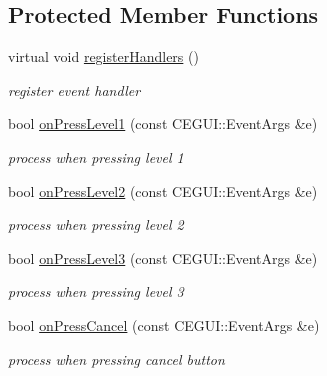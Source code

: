 \subsection*{Protected Member Functions}
\begin{DoxyCompactItemize}
\item 
virtual void \hyperlink{class_n_c_t_u_1_1_level_menu_window_a44e082fb42481f4e35e137feaf496279}{register\+Handlers} ()\hypertarget{class_n_c_t_u_1_1_level_menu_window_a44e082fb42481f4e35e137feaf496279}{}\label{class_n_c_t_u_1_1_level_menu_window_a44e082fb42481f4e35e137feaf496279}

\begin{DoxyCompactList}\small\item\em register event handler \end{DoxyCompactList}\item 
bool \hyperlink{class_n_c_t_u_1_1_level_menu_window_a25b3e0c122775b66a69343e112b9d49c}{on\+Press\+Level1} (const C\+E\+G\+U\+I\+::\+Event\+Args \&e)\hypertarget{class_n_c_t_u_1_1_level_menu_window_a25b3e0c122775b66a69343e112b9d49c}{}\label{class_n_c_t_u_1_1_level_menu_window_a25b3e0c122775b66a69343e112b9d49c}

\begin{DoxyCompactList}\small\item\em process when pressing level 1 \end{DoxyCompactList}\item 
bool \hyperlink{class_n_c_t_u_1_1_level_menu_window_ab238bddb760fed4bb50f92a4e4980923}{on\+Press\+Level2} (const C\+E\+G\+U\+I\+::\+Event\+Args \&e)\hypertarget{class_n_c_t_u_1_1_level_menu_window_ab238bddb760fed4bb50f92a4e4980923}{}\label{class_n_c_t_u_1_1_level_menu_window_ab238bddb760fed4bb50f92a4e4980923}

\begin{DoxyCompactList}\small\item\em process when pressing level 2 \end{DoxyCompactList}\item 
bool \hyperlink{class_n_c_t_u_1_1_level_menu_window_ac9ac75a48ed22a84e5ca5f7e9760a899}{on\+Press\+Level3} (const C\+E\+G\+U\+I\+::\+Event\+Args \&e)\hypertarget{class_n_c_t_u_1_1_level_menu_window_ac9ac75a48ed22a84e5ca5f7e9760a899}{}\label{class_n_c_t_u_1_1_level_menu_window_ac9ac75a48ed22a84e5ca5f7e9760a899}

\begin{DoxyCompactList}\small\item\em process when pressing level 3 \end{DoxyCompactList}\item 
bool \hyperlink{class_n_c_t_u_1_1_level_menu_window_a0ea6a4eb90ebdd516665e56c21065c2f}{on\+Press\+Cancel} (const C\+E\+G\+U\+I\+::\+Event\+Args \&e)\hypertarget{class_n_c_t_u_1_1_level_menu_window_a0ea6a4eb90ebdd516665e56c21065c2f}{}\label{class_n_c_t_u_1_1_level_menu_window_a0ea6a4eb90ebdd516665e56c21065c2f}

\begin{DoxyCompactList}\small\item\em process when pressing cancel button \end{DoxyCompactList}\end{DoxyCompactItemize}
